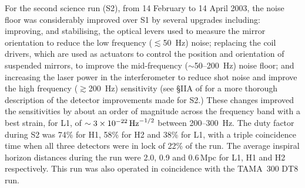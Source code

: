 \documentclass{article}
\begin{document}

For the second science run (S2), from 14 February to 14 April 2003, the noise
floor was considerably improved over S1 by several upgrades including:
improving, and stabilising, the optical levers used to measure the mirror
orientation to reduce the low frequency ($\lesssim$50~Hz) noise; replacing the
coil drivers, which are used as actuators to control the position and
orientation of suspended mirrors, to improve the mid-frequency
($\sim$50--200~Hz) noise floor; and increasing the laser power in the
interferometer to reduce shot noise and improve the high frequency
($\gtrsim$200~Hz) sensitivity (see \S{}IIA of \cite{Abbott:2005a} for a more
thorough description of the detector improvements made for S2.) These changes
improved the sensitivities by about an order of magnitude across the frequency
band with a best strain, for L1, of $\sim3\times10^{-22}\,{\rm Hz}^{-1/2}$
between 200--300~Hz. The duty factor during S2 was 74\% for H1, 58\% for H2 and
38\% for L1, with a triple coincidence time when all three detectors were in
lock of 22\% of the run. The average inspiral horizon distances during the run
were 2.0, 0.9 and 0.6\,Mpc for L1, H1 and H2 respectively. This run was also
operated in coincidence with the TAMA~300 DT8 run.
\end{document}
